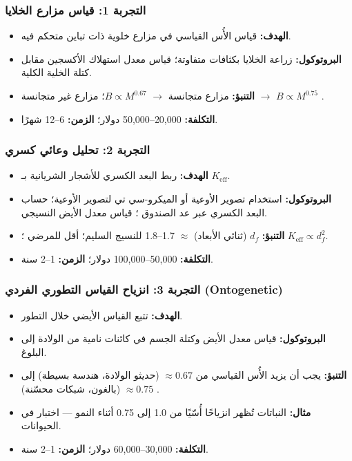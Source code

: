 \documentclass[11pt,a4paper]{article}
\newcommand{\Keff}{K_{\mathrm{eff}}}
\begin{document}
	\subsubsection{التجربة 1: قياس مزارع الخلايا}
	\begin{itemize}
		\item \textbf{الهدف:} قياس الأُس القياسي في مزارع خلوية ذات تباين متحكم فيه.
		\item \textbf{البروتوكول:} زراعة الخلايا بكثافات متفاوتة؛ قياس معدل استهلاك الأكسجين مقابل كتلة الخلية الكلية.
		\item \textbf{التنبؤ:} مزارع متجانسة \(\rightarrow\) \(B \propto M^{0.67}\)؛ مزارع غير متجانسة \(\rightarrow\) \(B \propto M^{0.75}\) \cite{Takemoto2015}.
		\item \textbf{التكلفة:} 20,000–50,000 دولار؛ \textbf{الزمن:} 6–12 شهرًا.
	\end{itemize}
	
	\subsubsection{التجربة 2: تحليل وعائي كسري}
	\begin{itemize}
		\item \textbf{الهدف:} ربط البعد الكسري للأشجار الشريانية بـ \(\Keff\).
		\item \textbf{البروتوكول:} استخدام تصوير الأوعية أو الميكرو-سي تي لتصوير الأوعية؛ حساب البعد الكسري عبر عد الصندوق \cite{Cross1993}؛ قياس معدل الأيض النسيجي.
		\item \textbf{التنبؤ:} \(d_f\) (ثنائي الأبعاد) \(\approx\) 1.7–1.8 للنسيج السليم؛ أقل للمرضي \cite{Gould1993}؛ \(\Keff \propto d_f^2\).
		\item \textbf{التكلفة:} 50,000–100,000 دولار؛ \textbf{الزمن:} 1–2 سنة.
	\end{itemize}
	
	\subsubsection{التجربة 3: انزياح القياس التطوري الفردي (Ontogenetic)}
	\begin{itemize}
		\item \textbf{الهدف:} تتبع القياس الأيضي خلال التطور.
		\item \textbf{البروتوكول:} قياس معدل الأيض وكتلة الجسم في كائنات نامية من الولادة إلى البلوغ.
		\item \textbf{التنبؤ:} يجب أن يزيد الأُس القياسي من \(\approx 0.67\) (حديثو الولادة، هندسة بسيطة) إلى \(\approx 0.75\) (بالغون، شبكات محسّنة) \cite{Glazier2005}.
		\item \textbf{مثال:} النباتات تُظهر انزياحًا أُسّيًا من 1.0 إلى 0.75 أثناء النمو \cite{Reich2006} — اختبار في الحيوانات.
		\item \textbf{التكلفة:} 30,000–60,000 دولار؛ \textbf{الزمن:} 1–2 سنة.
	\end{itemize}
	
\end{document}
